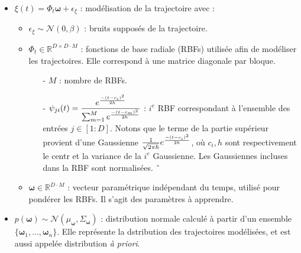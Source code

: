 \documentclass[utf8]{frontiersSCNS} %
\newcommand{\rev}[1]{\textcolor{blue}{#1}}
\newcommand{\todo}[1]{\textcolor{red}{\textbf{/*#1*/}}}
\begin{document}
\begin{itemize}
\item $\xi(t) = \Phi_t \boldsymbol{\omega} + \epsilon_\xi$ : modélisation de la trajectoire avec :
\begin{itemize}
\item $\epsilon_\xi \sim \mathcal{N}(0, \beta)$ : bruits supposés de la trajectoire.
\item $\Phi_t \in \mathbb{R}^{D\times D \cdot M}$ : fonctions de base radiale (RBFs) utilisée afin de modéliser les trajectoires. Elle correspond à une matrice diagonale par bloque.
\begin{itemize}
\item[-] $M$ : nombre de RBFs.
\item[-] $ \psi_{ji}(t) =\dfrac{e^{-(t - c_i)^2 \over 2h}}{\sum_{m=1}^{M} e^{-(t - c_m)^2 \over 2h} }$ : $i^e$ RBF correspondant à l'ensemble des entrées $j \in [1:D]$. 
Notons que le terme de la partie supérieur provient d'une Gaussienne $\frac{1}{\sqrt{2\pi h}} e^{-(t - c_i)^2 \over 2h}$, où $ c_i, h$ sont respectivement le centr et la variance de la $i^e$ Gaussienne. Les Gaussiennes incluses dans la RBF sont normalisées.
ˆ%
\end{itemize}
\item $\boldsymbol{\omega} \in \mathbb{R}^{D \cdot M}$ : vecteur paramétrique indépendant du temps, utilisé pour pondérer les RBFs. Il s'agit des paramètres à apprendre.

\end{itemize}

\item $p(\boldsymbol{\omega}) \sim \mathcal{N}(\mu_{\boldsymbol{\omega}}, \Sigma_{\boldsymbol{\omega}})$ : distribution normale calculé à partir d'un ensemble $\{\boldsymbol{\omega}_1, \ldots, \boldsymbol{\omega}_n\}$.  Elle représente la dstribution des trajectoires modélisées, et est aussi appelée distribution \textit{à priori}.


\end{itemize}
\end{document}
